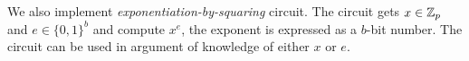 We also implement \textit{exponentiation-by-squaring} circuit. The circuit gets $x \in \mathbb{Z}_p$ and $e \in \{0, 1\}^b$ and compute $x^e$, the exponent is expressed as a $b$-bit number. The circuit can be used in argument of knowledge of either $x$ or $e$.

